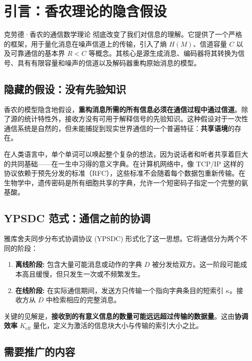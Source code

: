 \documentclass[12pt,a4paper]{article}
\theoremstyle{remark}
\newcommand{\Keff}{K_{\mathrm{eff}}}
\begin{document}
	\section{引言：香农理论的隐含假设}
	\label{sec:intro}
	
	克劳德·香农的通信数学理论 \cite{Shannon1948} 彻底改变了我们对信息的理解。它提供了一个严格的框架，用于量化消息在噪声信道上的传输，引入了熵 $H(M)$、信道容量 $C$ 以及可靠通信的基本界 $R < C$ 等概念。其核心是源生成消息、编码器将其转换为信号、具有有限容量和噪声的信道以及解码器重构原始消息的模型。
	
	\subsection{隐藏的假设：没有先验知识}
	
	香农的模型隐含地假设，\textbf{重构消息所需的所有信息必须在通信过程中通过信道}。除了源的统计特性外，接收方没有可用于解释信号的先验知识。这种假设对于一次性通信系统是自然的，但未能捕捉到现实世界通信的一个普遍特征：\textbf{共享语境}的存在。
	
	在人类语言中，单个单词可以唤起整个复杂的想法，因为说话者和听者共享着巨大的共同基础——在一生中习得的意义字典。在计算机网络中，像 TCP/IP 这样的协议依赖于预先分发的标准（RFC），这些标准不会随着每个数据包重新传输。在生物学中，遗传密码是所有细胞共享的字典，允许一个短密码子指定一个完整的氨基酸。
	
	\subsection{YPSDC 范式：通信之前的协调}
	
	雅库舍夫同步分布式协调协议 (YPSDC) \cite{Yakushev2026a, AppendixB} 形式化了这一思想。它将通信分为两个不同的阶段：
	\begin{enumerate}
		\item \textbf{离线阶段:} 包含大量可能消息或动作的字典 $D$ 被分发给双方。这一阶段可能成本高且缓慢，但只发生一次或不频繁发生。
		\item \textbf{在线阶段:} 在实际通信期间，发送方只传输一个指向字典条目的短索引 $\kappa$。接收方从 $D$ 中检索相应的完整消息。
	\end{enumerate}
	
	关键的见解是，\textbf{接收到的有意义信息的数量可能远远超过传输的数据量}。这由\textbf{协调效率} $\Keff$ 量化，定义为激活的信息块大小与传输的索引大小之比。
	
	\subsection{需要推广的内容}
	
\end{document}
